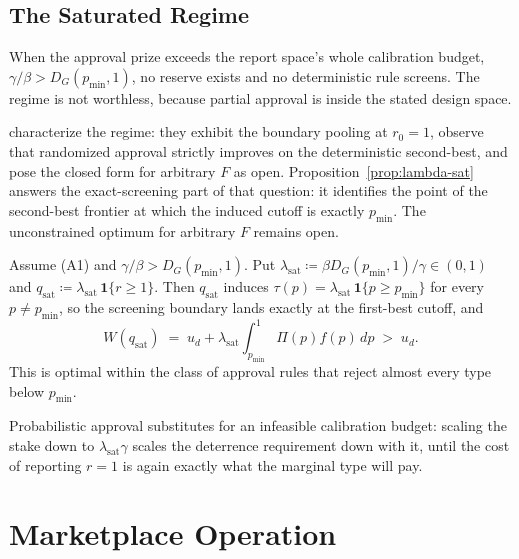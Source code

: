 \documentclass[acmsmall,nonacm,screen]{acmart}
\theoremstyle{acmplain}%
\theoremstyle{acmdefinition}%
\numberwithin{equation}{section}
\begin{document}
\subsection{The Saturated Regime}

When the approval prize exceeds the report space's whole calibration budget, $\gamma/\beta > D_G(p_{\min},1)$, no reserve exists and no deterministic rule screens. The regime is not worthless, because partial approval is inside the stated design space.

\citet{loven2026behavioral} characterize the regime: they exhibit the boundary pooling at $r_0 = 1$, observe that randomized approval strictly improves on the deterministic second-best, and pose the closed form for arbitrary $F$ as open. Proposition~\ref{prop:lambda-sat} answers the exact-screening part of that question: it identifies the point of the second-best frontier at which the induced cutoff is exactly $p_{\min}$. The unconstrained optimum for arbitrary $F$ remains open.

\begin{proposition}\label{prop:lambda-sat}
Assume (A1) and $\gamma/\beta > D_G(p_{\min},1)$. Put $\lambda_{\mathrm{sat}} \coloneqq \beta D_G(p_{\min},1)/\gamma \in (0,1)$ and $q_{\mathrm{sat}} \coloneqq \lambda_{\mathrm{sat}}\,\mathbf 1\{r \ge 1\}$. Then $q_{\mathrm{sat}}$ induces $\tau(p) = \lambda_{\mathrm{sat}}\,\mathbf 1\{p \ge p_{\min}\}$ for every $p \ne p_{\min}$, so the screening boundary lands exactly at the first-best cutoff, and
\[
W(q_{\mathrm{sat}}) \;=\; u_d + \lambda_{\mathrm{sat}}\int_{p_{\min}}^1 \Pi(p) f(p)\, dp \;>\; u_d .
\]
This is optimal within the class of approval rules that reject almost every type below $p_{\min}$.
\end{proposition}

Probabilistic approval substitutes for an infeasible calibration budget: scaling the stake down to $\lambda_{\mathrm{sat}}\gamma$ scales the deterrence requirement down with it, until the cost of reporting $r = 1$ is again exactly what the marginal type will pay.

\section{Marketplace Operation}\label{sec:market}
\end{document}
